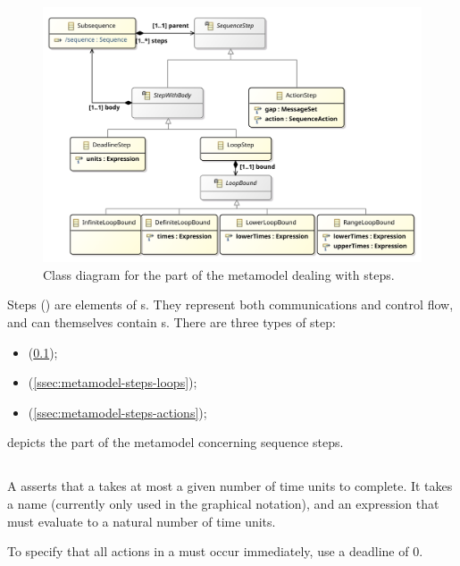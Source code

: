 \begin{figure}[htb]
	\centering
	\includegraphics[width=\textwidth]{diagrams/Steps}
	\caption{Class diagram for the part of the \langname{} metamodel dealing with steps.}
	\label{fig:metamodel-steps}
\end{figure}

\noindent
Steps (\msequencestep) are elements of
\msubsequence s.  They represent both communications and control flow, and
can themselves contain \msubsequence s.  There are three types of
step:

\begin{itemize}
\item \mdeadlinestep{} (\cref{ssec:metamodel-steps-deadlines});
\item \mloopstep{} (\cref{ssec:metamodel-steps-loops});
\item \mactionstep{} (\cref{ssec:metamodel-steps-actions});
\end{itemize}

 depicts the part of the metamodel concerning
sequence steps.

\subsection{\mdeadlinestep}\label{ssec:metamodel-steps-deadlines}

A \mdeadlinestep{} asserts that a \msubsequence{} takes at most
a given number of time units to complete.
It takes a name (currently only
used in the graphical notation), and an expression that must
evaluate to a natural number of time units.

\begin{remark}
To specify that all actions in a \msubsequence{} must occur
immediately, use a deadline of \(0\).
\end{remark}


